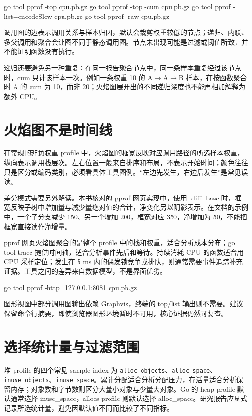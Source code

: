 \documentclass[UTF8,fontset=fandol,openany,11pt]{ctexbook}
\begin{document}
\begin{codeblock}
go tool pprof -top cpu.pb.gz
go tool pprof -top -cum cpu.pb.gz
go tool pprof -list=encodeSlow cpu.pb.gz
go tool pprof -raw cpu.pb.gz
\end{codeblock}

调用图的边表示调用关系与样本归因，默认会裁剪权重较低的节点；递归、内联、多父调用和聚合会让图不同于静态调用图。节点未出现可能是过滤或阈值所致，并不能证明函数没有执行。

递归还要避免另一种重复：在同一报告聚合节点中，同一条样本重复经过该节点时，cum 只计该样本一次。例如一条权重 10 的 A\ensuremath{\rightarrow}\allowbreak{}A\ensuremath{\rightarrow}\allowbreak{}B 样本，在按函数聚合时 A 的 cum 为 10，而非 20；火焰图展开出的不同递归深度也不能再相加解释为额外 CPU。\cite{tools-pprof-cli}

\section{火焰图不是时间线}
在常规的非负权重 profile 中，火焰图的框宽反映对应调用路径的所选样本权重，纵向表示调用栈层次。左右位置一般来自排序和布局，不表示开始时间；颜色往往只是区分或编码类别，必须看具体工具图例。“左边先发生，右边后发生”是常见误读。

差分模式需要另外解读。本书核对的 pprof 网页实现中，使用 -diff\_base 时，框宽反映子树中增加量与减少量绝对值的合计，净变化另以阴影表示。在文档的示例中，一个子分支减少 150、另一个增加 200，框宽对应 350，净增加为 50，不能把框宽直接读作净增量。\cite{tools-pprof-cli}

pprof 网页火焰图聚合的是整个 profile 中的栈和权重，适合分析成本分布；go tool trace 提供时间轴，适合分析事件先后和等待。持续消耗 CPU 的函数适合用 CPU 采样定位；发生在 5 ms 内的偶发锁竞争或排队，则通常需要事件追踪补充证据。工具之间的差异来自数据模型，不是界面优劣。

\begin{codeblock}
go tool pprof -http=127.0.0.1:8081 cpu.pb.gz
\end{codeblock}

图形视图中部分调用图输出依赖 Graphviz，终端的 top/list 输出则不需要。建议保留命令行摘要，即使浏览器图形环境暂时不可用，核心证据仍然可复查。

\section{选择统计量与过滤范围}
堆 profile 的四个常见 sample index 为 \texttt{alloc\_\allowbreak{}objects}、\texttt{alloc\_\allowbreak{}space}、\texttt{inuse\_\allowbreak{}objects}、\texttt{inuse\_\allowbreak{}space}。累计分配适合分析分配压力，存活量适合分析保留内存；对象数和字节数则区分大量小对象与少量大对象。Go 的 heap profile 默认通常选择 inuse\_space，allocs profile 则默认选择 alloc\_space。研究报告应显式记录所选统计量，避免因默认值不同而比较了不同指标。
\end{document}
